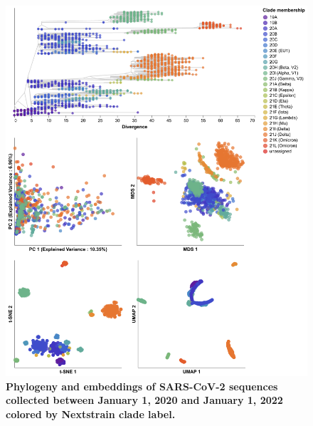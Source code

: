 \documentclass[10pt,letterpaper]{article}
\begin{document}
\begin{figure}[!h]
\includegraphics[width=\columnwidth]{figures/sarscov2-embeddings-by-Nextstrain_clade-clade.png}
\caption{{\bf Phylogeny and embeddings of SARS-CoV-2 sequences collected between January 1, 2020 and January 1, 2022 colored by Nextstrain clade label.}
}
\label{fig:sars-cov-2-early-embeddings-by-Nextstrain-clade}
\end{figure}
\end{document}
